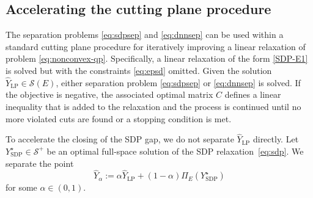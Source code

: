 \documentclass[twoside]{article}
\newcommand{\oo}[1]{{\textcolor{blue}{#1}}}
\newcommand{\ooc}[1]{{ \oo{[OG comment: #1}]}}
\newcommand{\jim}[1]{{ \oo{[Jim comment: #1}]}}
\begin{document}
	
	
	
	\subsection{Accelerating the cutting plane procedure}
	
		
		The separation problems \eqref{eq:sdpsep} and \eqref{eq:dnnsep} can be used within a standard cutting plane procedure for iteratively improving a linear relaxation of problem \eqref{eq:nonconvex-qp}. Specifically, a linear relaxation of the form \eqref{SDP-E1} is solved but with the constraints \eqref{eq:epsd} omitted. Given the solution $\widehat{Y}_{\text{LP}} \in\mathcal S(E)$, either separation problem \eqref{eq:sdpsep} or \eqref{eq:dnnsep} is solved. If the objective is negative, the associated optimal matrix $C$ defines a linear inequality that is added to the relaxation and the process is continued until no more violated cuts are found or a stopping condition is met.
		
		To accelerate the closing of the SDP gap, we do not separate $\widehat Y_{\mathrm{LP}}$ directly. Let $Y_{\mathrm{SDP}}^\star \in \mathcal S^+$ be an optimal full-space solution of the SDP relaxation~\eqref{eq:sdp}. We separate the point
		\[ \widehat Y_\alpha := \alpha \widehat{Y}_{\mathrm{LP}} + (1-\alpha) \Pi_E(Y_{\mathrm{SDP}}^\star) \]
		for some $\alpha \in (0,1)$.
		
\end{document}
